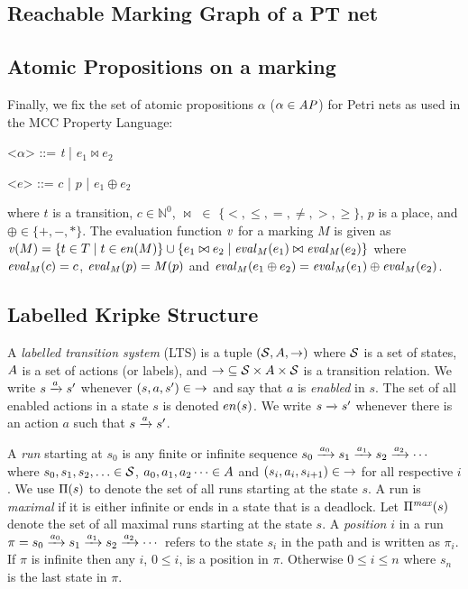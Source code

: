 \documentclass{llncs}
\begin{document}
\subsection{Reachable Marking Graph of a PT net}

\subsection{Atomic Propositions on a marking}

Finally, we fix the set of atomic propositions $\alpha$ ($\alpha \in \mathit{AP}$) 
for Petri nets as used in the MCC Property Language:
\begin{grammar}
    \let\syntleft\relax
    \let\syntright\relax
    <$\alpha$> ::= \textit{t} |  $e_1 \bowtie e_2$

    <$e$> ::= $c$ | $p$ | $e_1 \oplus e_2$
\end{grammar}
where  $t$ is a transition, $c \in \mathbb{N}^0$, $\bowtie$ $\in$ $\{<, \leq, =, \neq, >, \geq\}$, $p$ is a place, and $\oplus \in \{ +, -, * \}$.
The evaluation function $\mathit{v}$ for a marking $M$ is given as
$\apeval(M) = \{ t \in T \mid t \in \en(M) \} \cup
\{ e_1 \bowtie e_2 \mid \eval[M][e_1] \bowtie \eval[M][e_2]\}$
where $\eval[M][c] = c$, $\eval[M][p] = M(p)$ and
$\eval[M][e_{1} \oplus e_{2}] = \eval[M][e_{1}] \oplus \eval[M][e_{2}]$.


\subsection{Labelled Kripke Structure}

A \emph{labelled transition system} (LTS) is a 
tuple $(\mathcal{S}, A, \mathcal{\rightarrow})$ where $\mathcal{S}$ is a 
set of states, $A$ is a set of actions (or labels), 
and $\mathcal{\rightarrow}{} \subseteq \mathcal{S} \times A \times \mathcal{S}$ is a transition relation. We write $s \rtrans[a] s'$ 
whenever $(s,a,s') \in \mathcal{\rightarrow}$ and say that $a$ is \emph{enabled} in $s$.
The set of all enabled actions in a state $s$ is denoted $en(s)$.
We write $s \rtrans s'$ whenever there is an action $a$ such that
$s \rtrans[a] s'$.

A \emph{run} starting at $s_0$ is any finite or infinite sequence
$s_0 \rtrans[a_0] s_1 \rtrans[a_1] s_2 \rtrans[a_2] \cdots$ where
$s_0, s_1, s_2, \ldots \in \mathcal{S}$, 
$a_0, a_1, a_2 \cdots \in A$ and
$(s_i,a_i,s_{i+1}) \in \mathcal{\rightarrow}$ for all respective $i$.
We use $\Pi(s)$ to denote the set of all runs starting at the state $s$.
A run is \emph{maximal} if it is either infinite or ends in a state that
is a deadlock.  Let $\Pi^{\mathit{max}}(s)$ denote the set of all maximal 
runs starting at the state $s$.
A \emph{position} $i$ in a run $\pi = 
s_0 \rtrans[a_0] s_1 \rtrans[a_1] s_2 \rtrans[a_2] \cdots$
refers to the state $s_i$ in the path and is written as $\pi_i$.
If $\pi$ is infinite then any $i$, $0 \leq i$, is a position in $\pi$.
Otherwise $0 \leq i \leq n$ where $s_n$ is the last state in $\pi$.
\end{document}
